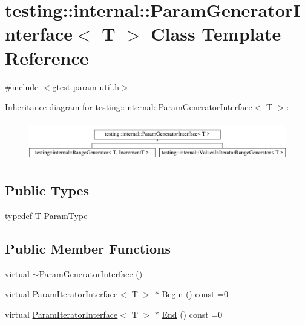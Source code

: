 \hypertarget{classtesting_1_1internal_1_1ParamGeneratorInterface}{}\section{testing\+::internal\+::Param\+Generator\+Interface$<$ T $>$ Class Template Reference}
\label{classtesting_1_1internal_1_1ParamGeneratorInterface}


{\ttfamily \#include $<$gtest-\/param-\/util.\+h$>$}

Inheritance diagram for testing\+::internal\+::Param\+Generator\+Interface$<$ T $>$\+:\begin{figure}[H]
\begin{center}
\leavevmode
\includegraphics[height=1.733746cm]{classtesting_1_1internal_1_1ParamGeneratorInterface}
\end{center}
\end{figure}
\subsection*{Public Types}
\begin{DoxyCompactItemize}
\item 
typedef T \mbox{\hyperlink{classtesting_1_1internal_1_1ParamGeneratorInterface_ab33d2ea424c50beaf503cb125b3cd003}{Param\+Type}}
\end{DoxyCompactItemize}
\subsection*{Public Member Functions}
\begin{DoxyCompactItemize}
\item 
virtual \mbox{\hyperlink{classtesting_1_1internal_1_1ParamGeneratorInterface_ac2767cb9ad2e292e291c4903323c6eff}{$\sim$\+Param\+Generator\+Interface}} ()
\item 
virtual \mbox{\hyperlink{classtesting_1_1internal_1_1ParamIteratorInterface}{Param\+Iterator\+Interface}}$<$ T $>$ $\ast$ \mbox{\hyperlink{classtesting_1_1internal_1_1ParamGeneratorInterface_ae1de83b16fe9a53c67778a026c6a9569}{Begin}} () const =0
\item 
virtual \mbox{\hyperlink{classtesting_1_1internal_1_1ParamIteratorInterface}{Param\+Iterator\+Interface}}$<$ T $>$ $\ast$ \mbox{\hyperlink{classtesting_1_1internal_1_1ParamGeneratorInterface_afa7211b74990e11d3fc7ad4e7113da4f}{End}} () const =0
\end{DoxyCompactItemize}


